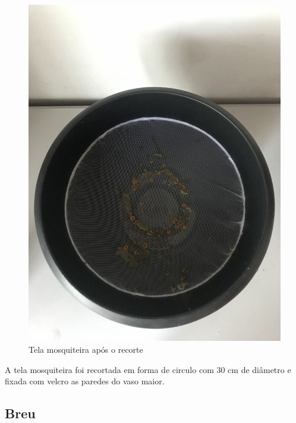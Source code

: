 \documentclass[
	12pt,				%
	openright,			%
	oneside,			%
	a4paper,			%
	chapter=TITLE,		%
	english,			%
	brazil				%
	]{abntex2}
\begin{document}
\begin{figure}[H]
    \centering
    \includegraphics[scale=0.04, angle=-90]{imagens/IMG_0610.jpg}
    \caption{Tela mosquiteira após o recorte}
    \label{fig:mosquiteirarecorte}
\end{figure}   

A tela mosquiteira foi recortada em forma de circulo com 30 cm de diâmetro e fixada com velcro as paredes do vaso maior.

\subsection{Breu}
\end{document}
